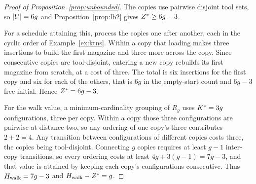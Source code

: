 \begin{proof}[Proof of Proposition~\ref{prop:unbounded}]
The copies use pairwise disjoint tool sets, so $\lvert U\rvert=6g$ and
Proposition~\ref{prop:lb2} gives $Z^{\ast}\ge6g-3$.

For a schedule attaining this, process the copies one after another, each in the
cyclic order of Example~\ref{ex:ktns}. Within a copy that loading makes three
insertions to build the first magazine and three more across the copy. Since
consecutive copies are tool-disjoint, entering a new copy rebuilds its first magazine
from scratch, at a cost of three. The total is six insertions for the first copy and
six for each of the others, that is $6g$ in the empty-start count and $6g-3$
free-initial. Hence $Z^{\ast}=6g-3$.

For the walk value, a minimum-cardinality grouping of $R_g$ uses $K^{\ast}=3g$
configurations, three per copy. Within a copy those three configurations are pairwise
at distance two, so any ordering of one copy's three contributes $2+2=4$. Any
transition between configurations of different copies costs three, the copies being
tool-disjoint. Connecting $g$ copies requires at least $g-1$ inter-copy transitions, so
every ordering costs at least $4g+3(g-1)=7g-3$, and that value is attained by keeping
each copy's configurations consecutive. Thus $H_{\mathrm{walk}}=7g-3$ and $H_{\mathrm{walk}}-Z^{\ast}=g$.
\end{proof}

